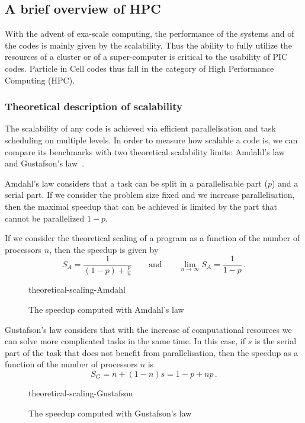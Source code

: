 \documentclass[12pt, class=report, crop=false]{standalone}
\begin{document}
\subsection{A brief overview of HPC}

With the advent of exa-scale computing, the performance of the systems and of the
codes is mainly given by the scalability.
Thus the ability to fully utilize the resources of a cluster or of a super-computer
is critical to the usability of PIC codes. Particle in Cell codes thus fall in
the category of High Performance Computing (HPC).

\subsubsection{Theoretical description of scalability}

The scalability of any code is achieved via efficient parallelisation and task
scheduling on multiple levels.
In order to measure how scalable a code is, we can compare its benchmarks with
two theoretical scalability limits: Amdahl's law~\autocite{amdahl_validitysingle_1967}
and Gustafson's law~\autocite{gustafson_reevaluatingamdahl_1988}.

Amdahl's law considers that a task can be split in a parallelisable part (\(p\)) and a
serial part. If we consider the problem size fixed and we increase parallelisation,
then the maximal speedup that can be achieved is limited by the part that cannot
be parallelized \(1-p\).

If we consider the theoretical scaling of a program as a function of the number
of processors \(n\), then the speedup is given by
\[
S_A = \frac{1}{(1-p)+\frac{p}{n}}
\qquad \text{and} \qquad
\lim_{n\to\infty} S_A = \frac{1}{1-p}\,.
\]

\begin{figure}[hb!]
  \centering
  {theoretical-scaling-Amdahl}%
  \caption{The speedup computed with Amdahl's law}\label{fig:theoretical-scaling-Amdahl}%
\end{figure}

Gustafson's law considers that with the increase of computational resources we
can solve more complicated tasks in the same time. In this case, if \(s\) is the
serial part of the task that does not benefit from parallelisation, then the speedup
as a function of the number of processors \(n\) is
\[
S_G = n + (1-n)s = 1 - p + np\,.
\]

\begin{figure}[h!]
  \centering
  {theoretical-scaling-Gustafson}%
  \caption{The speedup computed with Gustafson's law}\label{fig:theoretical-scaling-Gustafson}%
\end{figure}
\end{document}
